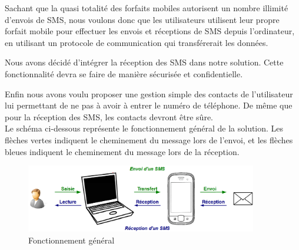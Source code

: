 Sachant que la quasi totalité des forfaits mobiles autorisent un nombre illimité d'envois de SMS, nous voulons donc que les utilisateurs utilisent leur propre forfait mobile pour effectuer les envois et réceptions de SMS depuis l'ordinateur, en utilisant un protocole de communication qui transférerait les données.

Nous avons décidé d'intégrer la réception des SMS dans notre solution.
Cette fonctionnalité devra se faire de manière sécurisée et confidentielle.

Enfin nous avons voulu proposer une gestion simple des contacts de l'utilisateur lui permettant de ne pas à avoir à entrer le numéro de téléphone.
De même que pour la réception des SMS, les contacts devront être sûre.
\\


Le schéma ci-dessous représente le fonctionnement général de la solution.
Les flèches vertes indiquent le cheminement du message lors de l'envoi, et les flèches bleues indiquent le cheminement du message lors de la réception.

\begin{figure}[!h]
	\center
	\includegraphics[width=0.9\textwidth]{img/schemaFonctionnement_general.png}
	\caption{Fonctionnement général}
	\label{schemaFonctionnement_general}
\end{figure}

